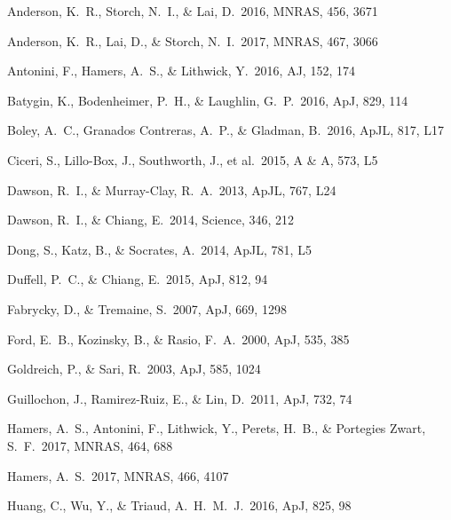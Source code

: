 \documentclass[12pt,useAMS, usenatbib]{mn2e}
\begin{document}
\begin{thebibliography}{}

Anderson, K.~R., Storch, N.~I., \& Lai, D.\ 2016, MNRAS, 456, 3671

Anderson, K.~R., Lai, D., \& Storch, N.~I.\ 2017, MNRAS, 467, 3066

Antonini, F., Hamers, A.~S., \& Lithwick, Y.\ 2016, AJ, 152, 174

Batygin, K., Bodenheimer, P.~H., \& Laughlin, G.~P.\ 2016, ApJ, 829, 114

Boley, A.~C., Granados Contreras, A.~P., \& Gladman, B.\ 2016, ApJL, 817, L17  %

Ciceri, S., Lillo-Box, J., Southworth, J., et al.\ 2015, A \& A, 573, L5 

Dawson, R.~I., \& Murray-Clay, R.~A.\ 2013, ApJL, 767, L24

Dawson, R.~I., \& Chiang, E.\ 2014, Science, 346, 212

Dong, S., Katz, B., \& Socrates, A.\ 2014, ApJL, 781, L5

Duffell, P.~C., \& Chiang, E.\ 2015, ApJ, 812, 94

Fabrycky, D., \& Tremaine, S.\ 2007, ApJ, 669, 1298

Ford, E.~B., Kozinsky, B., \& Rasio, F.~A.\ 2000, ApJ, 535, 385

Goldreich, P., \& Sari, R.\ 2003, ApJ, 585, 1024 

Guillochon, J., Ramirez-Ruiz, E., \& Lin, D.\ 2011, ApJ, 732, 74

Hamers, A.~S., Antonini, F., Lithwick, Y., Perets, H.~B., \& Portegies Zwart, S.~F.\ 2017, MNRAS, 464, 688

Hamers, A.~S.\ 2017, MNRAS, 466, 4107

Huang, C., Wu, Y., \& Triaud, A.~H.~M.~J.\ 2016, ApJ, 825, 98


\end{thebibliography}
\end{document}
